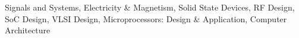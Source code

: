 


\begin{cvskillwrapper}
\begin{cvskills}

  \cvskill
    {}
    {Signals and Systems, Electricity \& Magnetism, Solid State Devices, RF Design, SoC Design, VLSI Design, Microprocessors: Design \& Application, Computer Architecture} %

\end{cvskills}


\end{cvskillwrapper}
